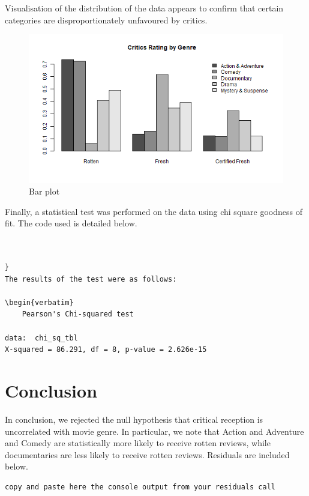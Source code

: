 \documentclass[12pt,a4paper]{article}
\begin{document}
Visualisation of the distribution of the data appears to confirm that certain categories are disproportionately unfavoured by critics.

\begin{figure}[h!]\centering
	\caption{\footnotesize Bar plot}
	\includegraphics[width=.75\textwidth]{barplot.png}
\end{figure} 

Finally, a statistical test was performed on the data using chi square goodness of fit. The code used is detailed below.

\begin{verbatim}


}
The results of the test were as follows:

\begin{verbatim}
	Pearson's Chi-squared test

data:  chi_sq_tbl
X-squared = 86.291, df = 8, p-value = 2.626e-15
\end{verbatim}

\section*{Conclusion}

In conclusion, we rejected the null hypothesis that critical reception is uncorrelated with movie genre. In particular, we note that Action and Adventure and Comedy are statistically more likely to receive rotten reviews, while documentaries are less likely to receive rotten reviews. Residuals are included below.

\begin{verbatim}
copy and paste here the console output from your residuals call
\end{verbatim}
\end{document}
